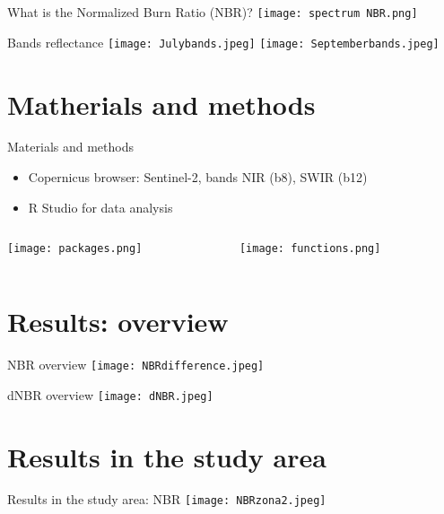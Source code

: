 \documentclass{beamer}
\begin{document}
\begin{frame}{What is the Normalized Burn Ratio (NBR)?}
\texttt{[image: spectrum NBR.png]}
\end{frame}

\begin{frame}{Bands reflectance}
\texttt{[image: Julybands.jpeg]}
\texttt{[image: Septemberbands.jpeg]}
\end{frame}



\section{Matherials and methods}

\begin{frame}{Materials and methods}
\begin{itemize}
    \item Copernicus browser: Sentinel-2, bands NIR (b8), SWIR (b12)
    \item R Studio for data analysis
\end{itemize}
\begin{columns}
    \begin{column}{0.5\textwidth}
        \texttt{[image: packages.png]}
    \end{column}
    \begin{column}{0.5\textwidth}
    \texttt{[image: functions.png]}
    \end{column}
\end{columns}
\end{frame}

\section{Results: overview}
\begin{frame}{NBR overview}
\texttt{[image: NBRdifference.jpeg]}
\end{frame}

\begin{frame}{dNBR overview}
  \texttt{[image: dNBR.jpeg]}  
\end{frame}

\section{Results in the study area}
\begin{frame}{Results in the study area: NBR}
\texttt{[image: NBRzona2.jpeg]}
\end{frame}
\end{document}
